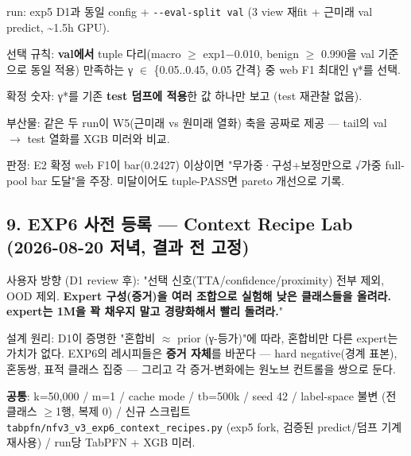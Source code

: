 \par\noindent \textbullet\enspace run: exp5 D1과 동일 config +\allowbreak{} \texttt{-\allowbreak{}-\allowbreak{}eval-\allowbreak{}s\allowbreak{}plit val\allowbreak{}} (3 view 재fit +\allowbreak{} 근미래 val predict, \textasciitilde{}1.5h GPU).


\par\noindent \textbullet\enspace 선택 규칙: \textbf{val에서} tuple 다리(macro \ensuremath{\geq} exp1−0.010, benign \ensuremath{\geq} 0.990을 val 기준으로 동일 적용) 만족하는 γ \ensuremath{\in} \{0.05..0.45, 0.05 간격\} 중 web F1 최대인 γ*를 선택.


\par\noindent \textbullet\enspace 확정 숫자: γ*를 기존 \textbf{test 덤프에 적용}한 값 하나만 보고 (test 재관찰 없음).


\par\noindent \textbullet\enspace 부산물: 같은 두 run이 W5(근미래 vs 원미래 열화) 축을 공짜로 제공 — tail의 val \ensuremath{\rightarrow} test 열화를 XGB 미러와 비교.


\par\noindent \textbullet\enspace 판정: E2 확정 web F1이 bar(0.2427) 이상이면 "무가중·구성+\allowbreak{}보정만으로 √가중 full-pool bar 도달"을 주장. 미달이어도 tuple-PASS면 pareto 개선으로 기록.


\subsection{9. EXP6 사전 등록 — Context Recipe Lab (2026-08-20 저녁, 결과 전 고정)}
사용자 방향 (D1 review 후): "선택 신호(TTA/\allowbreak{}confidence/\allowbreak{}proximity) 전부 제외, OOD 제외. \textbf{Expert 구성(증거)을 여러 조합으로 실험해 낮은 클래스들을 올려라. expert는 1M을 꽉 채우지 말고 경량화해서 빨리 돌려라.}"

설계 원리: D1이 증명한 "혼합비 \ensuremath{\approx} prior (γ-등가)"에 따라, 혼합비만 다른 expert는 가치가 없다. EXP6의 레시피들은 \textbf{증거 자체}를 바꾼다 — hard negative(경계 표본), 혼동쌍, 표적 클래스 집중 — 그리고 각 증거-변화에는 원노브 컨트롤을 쌍으로 둔다.

\textbf{공통}: k=\allowbreak{}50,000 /\allowbreak{} m=\allowbreak{}1 /\allowbreak{} cache mode /\allowbreak{} tb=\allowbreak{}500k /\allowbreak{} seed 42 /\allowbreak{} label-space 불변 (전 클래스 \ensuremath{\geq}1행, 복제 0) /\allowbreak{} 신규 스크립트 \texttt{tabpfn/\allowbreak{}\allowbreak{}n\allowbreak{}fv3\_\allowbreak{}\allowbreak{}v3\_\allowbreak{}\allowbreak{}e\allowbreak{}xp6\_\allowbreak{}\allowbreak{}cont\allowbreak{}ext\_\allowbreak{}\allowbreak{}reci\allowbreak{}pes.\allowbreak{}py} (exp5 fork, 검증된 predict/\allowbreak{}덤프 기계 재사용) /\allowbreak{} run당 TabPFN +\allowbreak{} XGB 미러.

